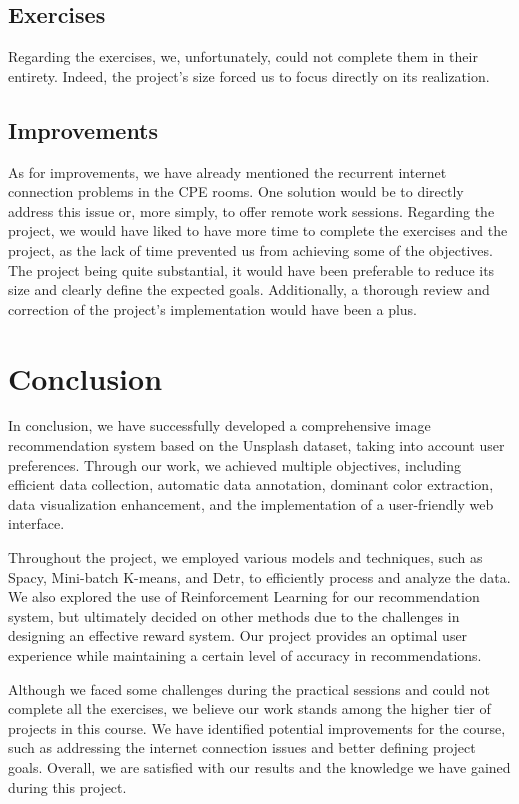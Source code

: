 \documentclass{article}
\begin{document}
    \subsection{Exercises}\label{subsec:exercises}
    Regarding the exercises, we, unfortunately, could not complete them in their entirety.
    Indeed, the project's size forced us to focus directly on its realization.

    \subsection{Improvements}\label{subsec:improvements}
    As for improvements, we have already mentioned the recurrent internet connection problems in the CPE rooms.
    One solution would be to directly address this issue or, more simply, to offer remote work sessions.
    Regarding the project, we would have liked to have more time to complete the exercises and the project, as the lack of time prevented us from achieving some of the objectives.
    The project being quite substantial, it would have been preferable to reduce its size and clearly define the expected goals.
    Additionally, a thorough review and correction of the project's implementation would have been a plus.

    \section{Conclusion}\label{sec:conclusion}

    In conclusion, we have successfully developed a comprehensive image recommendation system based on the Unsplash dataset, taking into account user preferences.
    Through our work, we achieved multiple objectives, including efficient data collection, automatic data annotation, dominant color extraction, data visualization enhancement, and the implementation of a user-friendly web interface.

    Throughout the project, we employed various models and techniques, such as Spacy, Mini-batch K-means, and Detr, to efficiently process and analyze the data.
    We also explored the use of Reinforcement Learning for our recommendation system, but ultimately decided on other methods due to the challenges in designing an effective reward system.
    Our project provides an optimal user experience while maintaining a certain level of accuracy in recommendations.

    Although we faced some challenges during the practical sessions and could not complete all the exercises, we believe our work stands among the higher tier of projects in this course.
    We have identified potential improvements for the course, such as addressing the internet connection issues and better defining project goals.
    Overall, we are satisfied with our results and the knowledge we have gained during this project.
\end{document}
